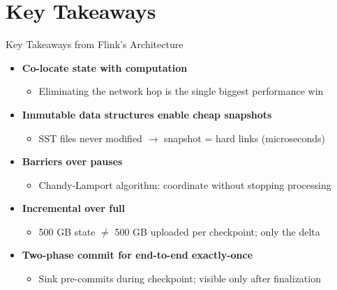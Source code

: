\documentclass[aspectratio=169]{beamer}
\begin{document}
\section{Key Takeaways}

\begin{frame}{Key Takeaways from Flink's Architecture}
    \begin{itemize}
        \item \textbf{Co-locate state with computation}
        \begin{itemize}
            \item Eliminating the network hop is the single biggest performance win
        \end{itemize}

        \vspace{0.15cm}
        \item \textbf{Immutable data structures enable cheap snapshots}
        \begin{itemize}
            \item SST files never modified $\rightarrow$ snapshot = hard links (microseconds)
        \end{itemize}

        \vspace{0.15cm}
        \item \textbf{Barriers over pauses}
        \begin{itemize}
            \item Chandy-Lamport algorithm: coordinate without stopping processing
        \end{itemize}

        \vspace{0.15cm}
        \item \textbf{Incremental over full}
        \begin{itemize}
            \item 500 GB state $\neq$ 500 GB uploaded per checkpoint; only the delta
        \end{itemize}

        \vspace{0.15cm}
        \item \textbf{Two-phase commit for end-to-end exactly-once}
        \begin{itemize}
            \item Sink pre-commits during checkpoint; visible only after finalization
        \end{itemize}
    \end{itemize}
\end{frame}
\end{document}
